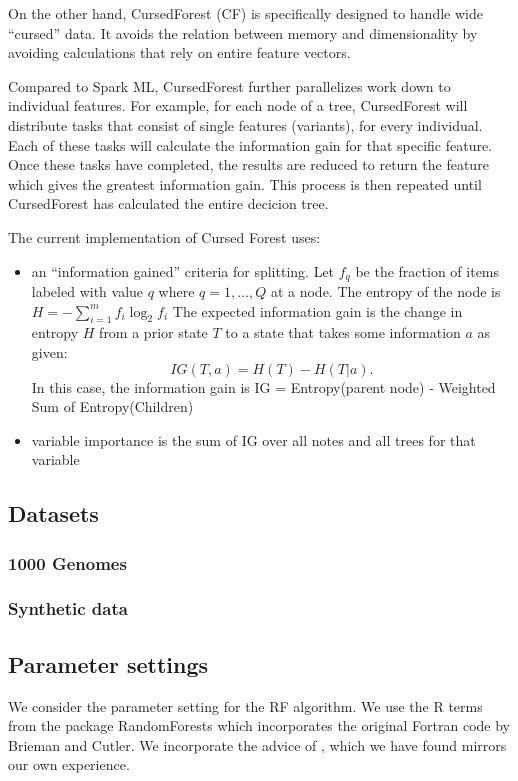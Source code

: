 \documentclass[10pt,a4paper]{article}  %
\begin{document}
On the other hand, CursedForest (CF) is specifically designed to handle wide ``cursed'' data. It avoids the relation between
memory and dimensionality by avoiding calculations that rely on entire feature vectors.

Compared to Spark ML, CursedForest further parallelizes work down to individual features. 
For example, for each node of a tree, CursedForest will distribute tasks that consist of single features (variants), for every individual.
Each of these tasks will calculate the information gain for that specific feature.
Once these tasks have completed, the results are reduced to return the feature which gives the greatest information gain.
This process is then repeated until CursedForest has calculated the entire decicion tree.


The current implementation of Cursed Forest uses:
\begin{itemize}
\item an ``information gained'' criteria for splitting. Let $f_q$ be the fraction of items labeled with value $q$ where $q= 1,
  \ldots, Q$ at a node. The  entropy of the node is $H = - \sum^{m}_{i=1} f_i \log^{}_2 f_i$
The expected information gain is the change in entropy $H$ from a prior state $T$ to a state that takes some
information $a$ as given: 
\[ IG(T,a) = H(T) - H(T|a). \]
In this case, the information gain is IG = Entropy(parent node) - Weighted Sum of Entropy(Children)
\item variable importance is the sum of IG over all notes and all trees for that variable
\end{itemize}


\subsection{Datasets}
\subsubsection{1000 Genomes}
\subsubsection{Synthetic data} 


\subsection{Parameter settings}
We consider the parameter setting for the RF algorithm. We use the R terms from the package RandomForests
\cite{Liaw.and.Weiner.2002} which incorporates the original Fortran code by Brieman and Cutler. We incorporate the 
advice of \cite{Liaw.and.Weiner.2002}, which we have found mirrors our own experience.
\end{document}
